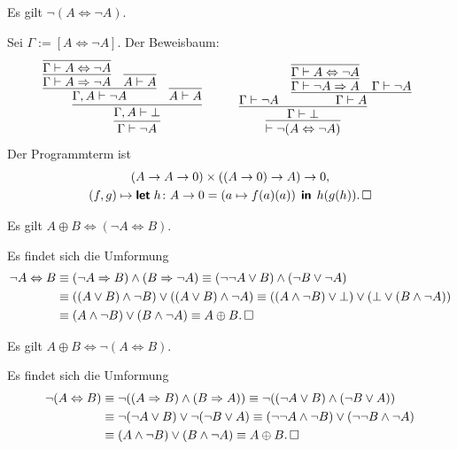 \begin{Satz}\label{non-eq-prop-neg}
Es gilt $\neg (A\Leftrightarrow\neg A)$.
\end{Satz}
\begin{Beweis}
Sei $\Gamma:=[A\Leftrightarrow\neg A]$. Der Beweisbaum:
\[
\begin{array}{@{}l@{\qquad\quad}l}
\infer{\Gamma\vdash\neg A}{
  \infer{\Gamma,A\vdash\bot}{
    \infer{\Gamma,A\vdash\neg A}{
      \infer{\Gamma\vdash A\Rightarrow\neg A}{
        \infer{\Gamma\vdash A\Leftrightarrow\neg A}{}}
    & \infer{A\vdash A}{}}
  & \infer{A\vdash A}{}}}
&
\infer{\vdash\neg (A\Leftrightarrow\neg A)}{
  \infer{\Gamma\vdash\bot}{
    \Gamma\vdash\neg A
  & \infer{\Gamma\vdash A}{
      \infer{\Gamma\vdash\neg A\Rightarrow A}{
        \infer{\Gamma\vdash A\Leftrightarrow\neg A}{}}
    & \Gamma\vdash\neg A}}}
\end{array}
\]
Der Programmterm ist
\begin{gather*}
(A\to A\to 0)\times ((A\to 0)\to A)\to 0,\\
(f,g)\mapsto\text{{\normalfont\sffamily\bfseries let}}\; h\colon A\to 0 = (a\mapsto f(a)(a))
\;\,\text{{\normalfont\sffamily\bfseries in}}\;\, h(g(h)).\,\square
\end{gather*}
\end{Beweis}

\newpage
\begin{Satz}\label{xor-char1}\strong{[LEM]}
Es gilt $A\oplus B \Leftrightarrow (\neg A\Leftrightarrow B)$.
\end{Satz}
\begin{Beweis}
Es findet sich die Umformung
\begin{align*}
\neg A\Leftrightarrow B
&\equiv (\neg A\Rightarrow B)\land (B\Rightarrow\neg A)
\equiv (\neg\neg A\lor B)\land (\neg B\lor\neg A)\\
&\equiv ((A\lor B)\land\neg B)\lor ((A\lor B)\land\neg A)
\equiv ((A\land\neg B)\lor\bot)\lor (\bot\lor (B\land\neg A))\\
&\equiv (A\land\neg B)\lor (B\land\neg A)
\equiv A\oplus B.\,\square
\end{align*}
\end{Beweis}

\begin{Satz}\label{xor-char2}\strong{[LEM]}
Es gilt $A\oplus B \Leftrightarrow \neg (A\Leftrightarrow B)$.
\end{Satz}
\begin{Beweis}
Es findet sich die Umformung
\begin{align*}
\neg (A\Leftrightarrow B) &\equiv
\neg ((A\Rightarrow B)\land (B\Rightarrow A))
\equiv \neg ((\neg A\lor B)\land (\neg B\lor A))\\
&\equiv \neg (\neg A\lor B)\lor \neg (\neg B\lor A)
\equiv (\neg\neg A\land\neg B)\lor (\neg\neg B\land \neg A)\\
&\equiv (A\land\neg B)\lor (B\land\neg A) \equiv A\oplus B.\,\square
\end{align*}
\end{Beweis}

